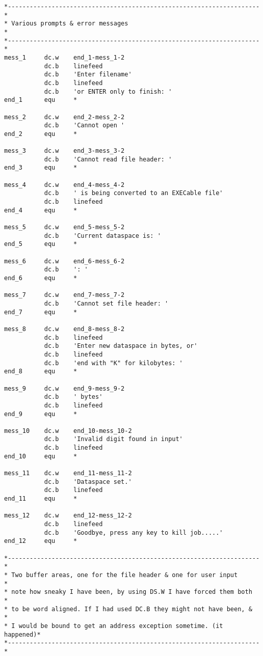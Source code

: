 \begin{lstlisting}[firstnumber=last,caption={Dataspace Program - Part 14 - Various Subroutines}]
*---------------------------------------------------------------------*
* Various prompts & error messages                                    *
*---------------------------------------------------------------------*
mess_1     dc.w    end_1-mess_1-2
           dc.b    linefeed
           dc.b    'Enter filename'
           dc.b    linefeed
           dc.b    'or ENTER only to finish: '
end_1      equ     *

mess_2     dc.w    end_2-mess_2-2
           dc.b    'Cannot open '
end_2      equ     *

mess_3     dc.w    end_3-mess_3-2
           dc.b    'Cannot read file header: '
end_3      equ     *

mess_4     dc.w    end_4-mess_4-2
           dc.b    ' is being converted to an EXECable file'
           dc.b    linefeed
end_4      equ     *

mess_5     dc.w    end_5-mess_5-2
           dc.b    'Current dataspace is: '
end_5      equ     *

mess_6     dc.w    end_6-mess_6-2
           dc.b    ': '
end_6      equ     *

mess_7     dc.w    end_7-mess_7-2
           dc.b    'Cannot set file header: '
end_7      equ     *

mess_8     dc.w    end_8-mess_8-2
           dc.b    linefeed
           dc.b    'Enter new dataspace in bytes, or'
           dc.b    linefeed
           dc.b    'end with "K" for kilobytes: '
end_8      equ     *

mess_9     dc.w    end_9-mess_9-2
           dc.b    ' bytes'
           dc.b    linefeed
end_9      equ     *

mess_10    dc.w    end_10-mess_10-2
           dc.b    'Invalid digit found in input'
           dc.b    linefeed
end_10     equ     *

mess_11    dc.w    end_11-mess_11-2
           dc.b    'Dataspace set.'
           dc.b    linefeed
end_11     equ     *

mess_12    dc.w    end_12-mess_12-2
           dc.b    linefeed
           dc.b    'Goodbye, press any key to kill job.....'
end_12     equ     *

*---------------------------------------------------------------------*
* Two buffer areas, one for the file header & one for user input      *
* note how sneaky I have been, by using DS.W I have forced them both  *
* to be word aligned. If I had used DC.B they might not have been, &  *
* I would be bound to get an address exception sometime. (it happened)*
*---------------------------------------------------------------------*


\end{lstlisting}
